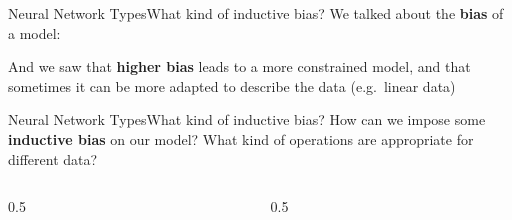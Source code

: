 \begin{frame}{Neural Network Types}{What kind of inductive bias?}
    We talked about the \textbf{bias} of a model:

    \vfill

    \begin{center}
        
    \end{center}

    \vfill

    And we saw that \textbf{higher bias} leads to a more constrained model, and that sometimes it can be more adapted to describe the data (e.g.\ linear data)
\end{frame}

\begin{frame}{Neural Network Types}{What kind of inductive bias?}
    How can we impose some \textbf{inductive bias} on our model? What kind of operations are appropriate for different data?

    \vfill

    \begin{columns}[T]
        \begin{column}{0.5\textwidth}
            \centering
            
        \end{column}
        \hfil
        \begin{column}{0.5\textwidth}
        \end{column}
    \end{columns}
\end{frame}

